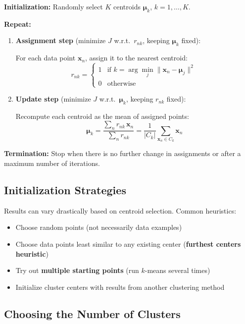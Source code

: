 \documentclass[11pt,a4paper]{article}
\theoremstyle{definition}
\theoremstyle{plain}
\theoremstyle{remark}
\begin{document}
\begin{tcolorbox}[colback=purple!5!white,colframe=purple!75!black,title=\textbf{$K$-Means Algorithm}]
\textbf{Initialization:} Randomly select $K$ centroids $\boldsymbol{\mu}_k$, $k = 1, \ldots, K$.

\textbf{Repeat:}
\begin{enumerate}
    \item \textbf{Assignment step} (minimize $J$ w.r.t.\ $r_{nk}$, keeping $\boldsymbol{\mu}_k$ fixed):

    For each data point $\mathbf{x}_n$, assign it to the nearest centroid:
    \[
    r_{nk} = \begin{cases} 1 & \text{if } k = \arg\min_j \|\mathbf{x}_n - \boldsymbol{\mu}_j\|^2 \\ 0 & \text{otherwise} \end{cases}
    \]

    \item \textbf{Update step} (minimize $J$ w.r.t.\ $\boldsymbol{\mu}_k$, keeping $r_{nk}$ fixed):

    Recompute each centroid as the mean of assigned points:
    \[
    \boldsymbol{\mu}_k = \frac{\sum_{n} r_{nk} \, \mathbf{x}_n}{\sum_{n} r_{nk}} = \frac{1}{|C_k|} \sum_{\mathbf{x}_n \in C_k} \mathbf{x}_n
    \]
\end{enumerate}

\textbf{Termination:} Stop when there is no further change in assignments or after a maximum number of iterations.
\end{tcolorbox}

\subsection{Initialization Strategies}

Results can vary drastically based on centroid selection. Common heuristics:
\begin{itemize}
    \item Choose random points (not necessarily data examples)
    \item Choose data points least similar to any existing center (\textbf{furthest centers heuristic})
    \item Try out \textbf{multiple starting points} (run $k$-means several times)
    \item Initialize cluster centers with results from another clustering method
\end{itemize}

\subsection{Choosing the Number of Clusters}
\end{document}

